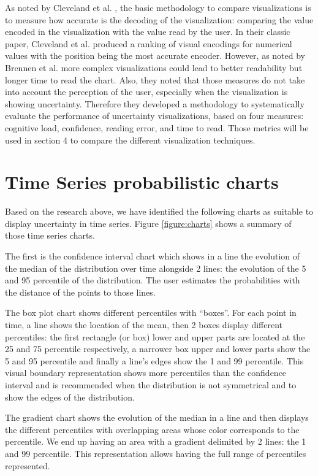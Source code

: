 \documentclass[a4paper,3p,sort&compress]{elsarticle}
\begin{document}
As noted by Cleveland et al. \cite{cleveland_graphical_1984}, the basic methodology to compare visualizations is to measure how accurate is the
decoding of the visualization: comparing the value encoded in the visualization with the value read
by the user. In their classic paper, Cleveland et al. \cite{cleveland_graphical_1984} produced a ranking of visual encodings for numerical values
with the position being the most accurate encoder. However, as noted by Brennen et al. \cite{brennen_instrument_2018}
more complex visualizations could lead to better readability but longer time to read the chart. Also,
they noted that those measures do not take into account the perception of the user, especially when the visualization
is showing uncertainty. Therefore they developed a methodology
to systematically evaluate the performance of uncertainty visualizations, based on four measures:
cognitive load, confidence, reading error, and time to read. Those metrics will be used in section 4 to compare the different
visualization techniques.

\section{Time Series probabilistic charts}
\label{sec:time_series}

Based on the research above, we have identified the following charts as suitable to display
uncertainty in time series. Figure \ref{figure:charts} shows a summary of those time series charts.

The first is the confidence interval chart which shows in a line the evolution of the
median of the distribution
 over time alongside 2 lines: the evolution of the 5 and 95 percentile of the distribution.
 The user estimates the probabilities with the distance of the points to those lines.

The box plot chart shows different percentiles with “boxes”. For each point in time, a
line shows the location of the mean, then 2 boxes display different percentiles: the
first rectangle (or box) lower and upper parts are located
at the 25 and 75 percentile respectively, a narrower box upper and lower parts show
the 5 and 95 percentile and finally a line’s edges show the 1 and 99 percentile.
This visual boundary representation shows more percentiles than the confidence interval and
is recommended when the distribution is not symmetrical and to show the edges of the distribution.

The gradient chart shows the evolution of the median in a line and then displays the different percentiles
with overlapping areas whose color corresponds to the percentile. We end up having an area with a gradient
delimited by 2 lines: the 1 and 99 percentile. This representation allows having the
 full range of percentiles represented.
\end{document}
